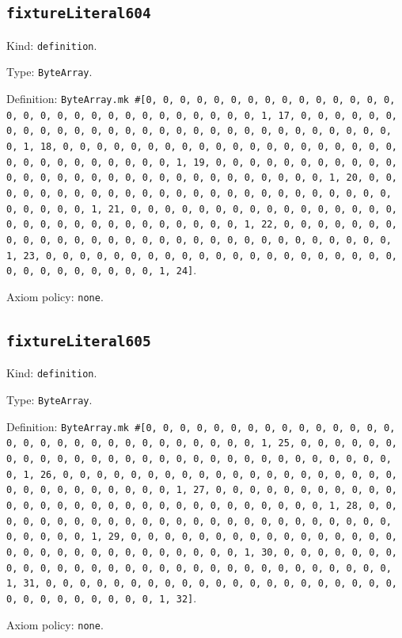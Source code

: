 \documentclass[11pt]{article}
\begin{document}
\subsection*{\texttt{fixtureLiteral604}}
\noindent Kind: \texttt{definition}.\par
\noindent Type: \texttt{ByteArray}.\par
\noindent Definition: \texttt{ByteArray.mk \#[0, 0, 0, 0, 0, 0, 0, 0, 0, 0, 0, 0, 0, 0, 0, 0, 0, 0, 0, 0, 0, 0, 0, 0, 0, 0, 0, 0, 0, 0, 1, 17, 0, 0, 0, 0, 0, 0, 0, 0, 0, 0, 0, 0, 0, 0, 0, 0, 0, 0, 0, 0, 0, 0, 0, 0, 0, 0, 0, 0, 0, 0, 1, 18, 0, 0, 0, 0, 0, 0, 0, 0, 0, 0, 0, 0, 0, 0, 0, 0, 0, 0, 0, 0, 0, 0, 0, 0, 0, 0, 0, 0, 0, 0, 1, 19, 0, 0, 0, 0, 0, 0, 0, 0, 0, 0, 0, 0, 0, 0, 0, 0, 0, 0, 0, 0, 0, 0, 0, 0, 0, 0, 0, 0, 0, 0, 1, 20, 0, 0, 0, 0, 0, 0, 0, 0, 0, 0, 0, 0, 0, 0, 0, 0, 0, 0, 0, 0, 0, 0, 0, 0, 0, 0, 0, 0, 0, 0, 1, 21, 0, 0, 0, 0, 0, 0, 0, 0, 0, 0, 0, 0, 0, 0, 0, 0, 0, 0, 0, 0, 0, 0, 0, 0, 0, 0, 0, 0, 0, 0, 1, 22, 0, 0, 0, 0, 0, 0, 0, 0, 0, 0, 0, 0, 0, 0, 0, 0, 0, 0, 0, 0, 0, 0, 0, 0, 0, 0, 0, 0, 0, 0, 1, 23, 0, 0, 0, 0, 0, 0, 0, 0, 0, 0, 0, 0, 0, 0, 0, 0, 0, 0, 0, 0, 0, 0, 0, 0, 0, 0, 0, 0, 0, 0, 1, 24]}.\par
\noindent Axiom policy: \texttt{none}.\par
\subsection*{\texttt{fixtureLiteral605}}
\noindent Kind: \texttt{definition}.\par
\noindent Type: \texttt{ByteArray}.\par
\noindent Definition: \texttt{ByteArray.mk \#[0, 0, 0, 0, 0, 0, 0, 0, 0, 0, 0, 0, 0, 0, 0, 0, 0, 0, 0, 0, 0, 0, 0, 0, 0, 0, 0, 0, 0, 0, 1, 25, 0, 0, 0, 0, 0, 0, 0, 0, 0, 0, 0, 0, 0, 0, 0, 0, 0, 0, 0, 0, 0, 0, 0, 0, 0, 0, 0, 0, 0, 0, 1, 26, 0, 0, 0, 0, 0, 0, 0, 0, 0, 0, 0, 0, 0, 0, 0, 0, 0, 0, 0, 0, 0, 0, 0, 0, 0, 0, 0, 0, 0, 0, 1, 27, 0, 0, 0, 0, 0, 0, 0, 0, 0, 0, 0, 0, 0, 0, 0, 0, 0, 0, 0, 0, 0, 0, 0, 0, 0, 0, 0, 0, 0, 0, 1, 28, 0, 0, 0, 0, 0, 0, 0, 0, 0, 0, 0, 0, 0, 0, 0, 0, 0, 0, 0, 0, 0, 0, 0, 0, 0, 0, 0, 0, 0, 0, 1, 29, 0, 0, 0, 0, 0, 0, 0, 0, 0, 0, 0, 0, 0, 0, 0, 0, 0, 0, 0, 0, 0, 0, 0, 0, 0, 0, 0, 0, 0, 0, 1, 30, 0, 0, 0, 0, 0, 0, 0, 0, 0, 0, 0, 0, 0, 0, 0, 0, 0, 0, 0, 0, 0, 0, 0, 0, 0, 0, 0, 0, 0, 0, 1, 31, 0, 0, 0, 0, 0, 0, 0, 0, 0, 0, 0, 0, 0, 0, 0, 0, 0, 0, 0, 0, 0, 0, 0, 0, 0, 0, 0, 0, 0, 0, 1, 32]}.\par
\noindent Axiom policy: \texttt{none}.\par
\end{document}
